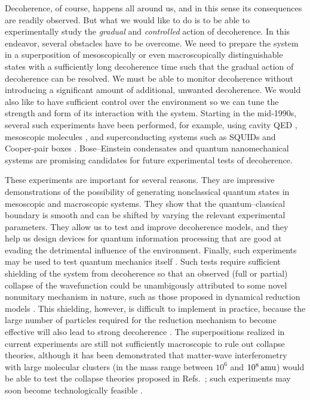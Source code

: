 \documentclass[aps,pra,reprint,amsmath,amssymb,showpacs,nofootinbib,floatfix,onecolumn,12pt]{revtex4-1}
\begin{document}
Decoherence, of course, happens all around us, and in this sense its consequences are readily observed. But what we would like to do is to be able to experimentally study the \emph{gradual} and \emph{controlled} action of decoherence. In this endeavor, several obstacles have to be overcome. We need to prepare the system in a superposition of mesoscopically or even macroscopically distinguishable states with a sufficiently long decoherence time such that the gradual action of decoherence can be resolved. We must be able to monitor decoherence without introducing a significant amount of additional, unwanted decoherence. We would also like to have sufficient control over the environment so we can tune the strength and form of its interaction with the system. Starting in the mid-1990s, several such experiments have been performed, for example, using cavity QED \cite{Raimond:2001:aa}, mesoscopic molecules \cite{Arndt:2005:mi}, and superconducting systems such as SQUIDs and Cooper-pair boxes \cite{Leggett:2002:uy}. Bose--Einstein condensates \cite{Kaiser:2001:tm} and quantum nanomechanical systems \cite{Blencowe:2004:mm,Aspelmeyer:2013:aa} are promising candidates for future experimental tests of decoherence.

These experiments are important for several reasons. They are impressive demonstrations of the possibility of generating nonclassical quantum states in mesoscopic and macroscopic systems. They show that the quantum--classical boundary is smooth and can be shifted by varying the relevant experimental parameters. They allow us to test and improve decoherence models, and they help us design devices for quantum information processing that are good at evading the detrimental influence of the environment. Finally, such experiments may be used to test quantum mechanics itself \cite{Leggett:2002:uy}. Such tests require sufficient shielding of the system from decoherence so that an observed (full or partial) collapse of the wavefunction could be unambigously attributed to some novel nonunitary mechanism in nature, such as those proposed in dynamical reduction models \cite{Bassi:2003:yb,Adler:2007:um,Bassi:2010:aa}. This shielding, however, is difficult to implement in practice, because the large number of particles required for the reduction mechanism to become effective will also lead to strong decoherence \cite{Tegmark:1993:uz,Nimmrichter:2013:aa}. The superpositions realized in current experiments are still not sufficiently macroscopic to rule out collapse theories, although it has been demonstrated \cite{Nimmrichter:2011:pr} that matter-wave interferometry with large molecular clusters (in the mass range between $10^6$ and $\unit[10^8]{amu}$) would be able to test the collapse theories proposed in Refs.~\cite{Adler:2007:um,Bassi:2010:aa}; such experiments may soon become technologically feasible \cite{Hornberger:2012:ii}. 
\end{document}
